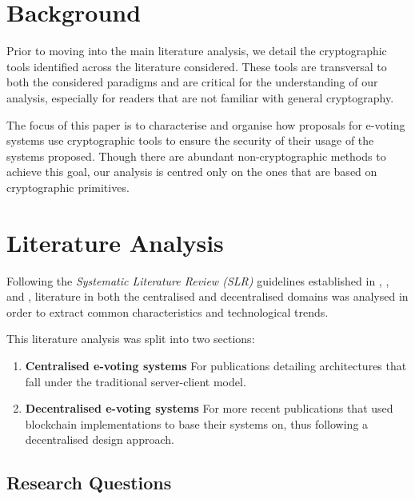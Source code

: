 \documentclass{ieeeaccess}
\begin{document}
\section{Background}
    \label{background}
    Prior to moving into the main literature analysis, we detail the cryptographic tools identified across the literature considered. These tools are transversal to both the considered paradigms and are critical for the understanding of our analysis, especially for readers that are not familiar with general cryptography.
    \par
    The focus of this paper is to characterise and organise how proposals for e-voting systems use cryptographic tools to ensure the security of their usage of the systems proposed. Though there are abundant non-cryptographic methods to achieve this goal, our analysis is centred only on the ones that are based on cryptographic primitives.
    
    
    \label{cryptographic_methods}

    \section{Literature Analysis}
\label{literature-analysis}
Following the \textit{Systematic Literature Review (SLR)} guidelines established in \cite{Kitechenham2009}, \cite{Petersen2008}, and \cite{Tranfield2003}, literature in both the centralised and decentralised domains was analysed in order to extract common characteristics and technological trends.
\par
This literature analysis was split into two sections:
\begin{enumerate}[I]
    \item \textbf{Centralised e-voting systems} For publications detailing architectures that fall under the traditional server-client model.
    \item \textbf{Decentralised e-voting systems} For more recent publications that used blockchain implementations to base their systems on, thus following a decentralised design approach.
\end{enumerate}

\subsection{Research Questions}
\label{research-questions}
\end{document}
